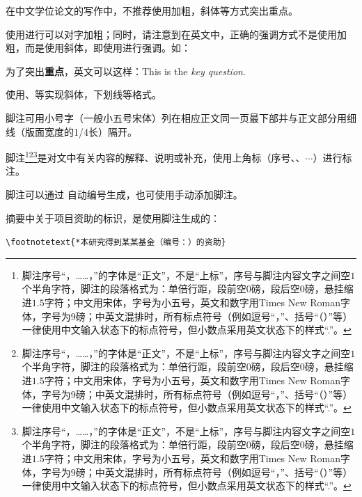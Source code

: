 在中文学位论文的写作中，不推荐使用加粗，斜体等方式突出重点。

使用进行可以对字加粗；同时，请注意到在英文中，正确的强调方式不是使用加粗，而是使用斜体，即使用进行强调。如：
\begin{texcode}[]{}
  为了突出\textbf{重点}，英文可以这样：This is the \emph{key question}.
\end{texcode}

使用、等实现斜体，下划线等格式。






\begin{tcolorbox}[colback=red!5!white,colframe=red!75!black]
  脚注可用小号字（一般小五号宋体）列在相应正文同一页最下部并与正文部分用细线（版面宽度的1/4长）隔开。
\end{tcolorbox}

脚注\footnote{脚注序号“，……，”的字体是“正文”，不是“上标”，序号与脚注内容文字之间空$1$个半角字符，脚注的段落格式为：单倍行距，段前空$0$磅，段后空$0$磅，悬挂缩进$1.5$字符；中文用宋体，字号为小五号，英文和数字用Times New Roman字体，字号为$9$磅；中英文混排时，所有标点符号（例如逗号“，”、括号“（）”等）一律使用中文输入状态下的标点符号，但小数点采用英文状态下的样式“.”。}\footnote{脚注序号“，……，”的字体是“正文”，不是“上标”，序号与脚注内容文字之间空$1$个半角字符，脚注的段落格式为：单倍行距，段前空$0$磅，段后空$0$磅，悬挂缩进$1.5$字符；中文用宋体，字号为小五号，英文和数字用Times New Roman字体，字号为$9$磅；中英文混排时，所有标点符号（例如逗号“，”、括号“（）”等）一律使用中文输入状态下的标点符号，但小数点采用英文状态下的样式“.”。}\footnote{脚注序号“，……，”的字体是“正文”，不是“上标”，序号与脚注内容文字之间空$1$个半角字符，脚注的段落格式为：单倍行距，段前空$0$磅，段后空$0$磅，悬挂缩进$1.5$字符；中文用宋体，字号为小五号，英文和数字用Times New Roman字体，字号为$9$磅；中英文混排时，所有标点符号（例如逗号“，”、括号“（）”等）一律使用中文输入状态下的标点符号，但小数点采用英文状态下的样式“.”。}是对文中有关内容的解释、说明或补充，使用上角标（序号、、$\cdots$）进行标注。

脚注可以通过 \clist{\footnote{}}自动编号生成，也可使用手动添加脚注。

摘要中关于项目资助的标识，是使用脚注生成的：

\begin{tcolorbox}
  \lstinline|\footnotetext{*本研究得到某某基金（编号：）的资助}|
\end{tcolorbox}


